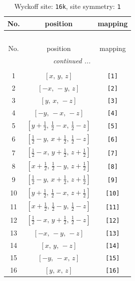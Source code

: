 \documentclass[fleqn,8pt]{jsarticle}
\begin{document}
\begin{longtable}{ccc}
\caption{Wyckoff site: {\tt 16k}, site symmetry: {\tt 1}}
 \\
 \hline \hline
No. & position & mapping \\ \hline \endfirsthead

\multicolumn{2}{l}{\tablename\ \thetable{}} \\
 \hline \hline
No. & position & mapping \\ \hline \endhead

 \hline \hline
\multicolumn{2}{r}{\footnotesize\it continued ...} \\ \endfoot

 \hline \hline
\multicolumn{2}{r}{} \\ \endlastfoot

1 & $\left[ x,\, y,\, z \right]$ & {\tt [1]} \\ \hline
2 & $\left[ - x,\, - y,\, z \right]$ & {\tt [2]} \\ \hline
3 & $\left[ y,\, x,\, - z \right]$ & {\tt [3]} \\ \hline
4 & $\left[ - y,\, - x,\, - z \right]$ & {\tt [4]} \\ \hline
5 & $\left[ y + \frac{1}{2},\, \frac{1}{2} - x,\, \frac{1}{2} - z \right]$ & {\tt [5]} \\ \hline
6 & $\left[ \frac{1}{2} - y,\, x + \frac{1}{2},\, \frac{1}{2} - z \right]$ & {\tt [6]} \\ \hline
7 & $\left[ \frac{1}{2} - x,\, y + \frac{1}{2},\, z + \frac{1}{2} \right]$ & {\tt [7]} \\ \hline
8 & $\left[ x + \frac{1}{2},\, \frac{1}{2} - y,\, z + \frac{1}{2} \right]$ & {\tt [8]} \\ \hline
9 & $\left[ \frac{1}{2} - y,\, x + \frac{1}{2},\, z + \frac{1}{2} \right]$ & {\tt [9]} \\ \hline
10 & $\left[ y + \frac{1}{2},\, \frac{1}{2} - x,\, z + \frac{1}{2} \right]$ & {\tt [10]} \\ \hline
11 & $\left[ x + \frac{1}{2},\, \frac{1}{2} - y,\, \frac{1}{2} - z \right]$ & {\tt [11]} \\ \hline
12 & $\left[ \frac{1}{2} - x,\, y + \frac{1}{2},\, \frac{1}{2} - z \right]$ & {\tt [12]} \\ \hline
13 & $\left[ - x,\, - y,\, - z \right]$ & {\tt [13]} \\ \hline
14 & $\left[ x,\, y,\, - z \right]$ & {\tt [14]} \\ \hline
15 & $\left[ - y,\, - x,\, z \right]$ & {\tt [15]} \\ \hline
16 & $\left[ y,\, x,\, z \right]$ & {\tt [16]} \\
\end{longtable}
\end{document}
